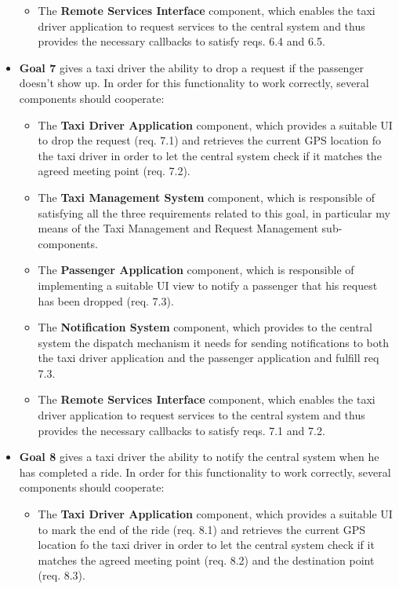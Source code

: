 \begin{itemize}
\begin{itemize}
	\item The \textbf{Remote Services Interface} component, which enables the taxi driver application to request services to the central system and thus provides the necessary callbacks to satisfy reqs. 6.4 and 6.5.
	\end{itemize}
	\item \textbf{Goal 7} gives a taxi driver the ability to drop a request if the passenger doesn't show up. In order for this functionality to work correctly, several components should cooperate:
	\begin{itemize}
	\item The \textbf{Taxi Driver Application} component, which provides a suitable UI to drop the request (req. 7.1) and retrieves the current GPS location fo the taxi driver in order to let the central system check if it matches the agreed meeting point (req. 7.2).
	\item The \textbf{Taxi Management System} component, which is responsible of satisfying all the three requirements related to this goal, in particular my means of the Taxi Management and Request Management sub-components.
	\item The \textbf{Passenger Application} component, which is responsible of implementing a suitable UI view to notify a passenger that his request has been dropped (req. 7.3).
	\item The \textbf{Notification System} component, which provides to the central system the dispatch mechanism it needs for sending notifications to both the taxi driver application and the passenger application and fulfill req 7.3.
	\item The \textbf{Remote Services Interface} component, which enables the taxi driver application to request services to the central system and thus provides the necessary callbacks to satisfy reqs. 7.1 and 7.2.
	\end{itemize}
	\item \textbf{Goal 8} gives a taxi driver the ability to notify the central system when he has completed a ride. In order for this functionality to work correctly, several components should cooperate:
	\begin{itemize}
	\item The \textbf{Taxi Driver Application} component, which provides a suitable UI to mark the end of the ride (req. 8.1) and retrieves the current GPS location fo the taxi driver in order to let the central system check if it matches the agreed meeting point (req. 8.2) and the destination point (req. 8.3).

\end{itemize}
\end{itemize}
